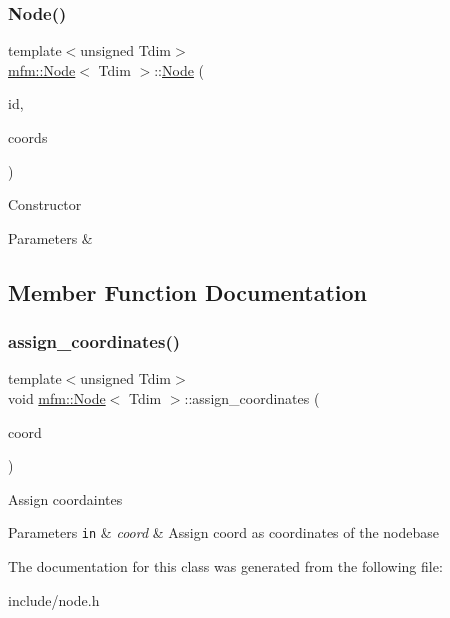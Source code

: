 \subsubsection{\texorpdfstring{Node()}{Node()}}
{\footnotesize\ttfamily template$<$unsigned Tdim$>$ \\
\hyperlink{classmfm_1_1_node}{mfm\+::\+Node}$<$ Tdim $>$\+::\hyperlink{classmfm_1_1_node}{Node} (\begin{DoxyParamCaption}\item[{\hyperlink{namespacemfm_a7d021c8caa1852f673d78358edc6b7f9}{mfm\+::\+Index}}]{id,  }\item[{const \hyperlink{classmfm_1_1_node_a528ae22876ff7f38409424f9db181727}{Vector\+Dim} \&}]{coords }\end{DoxyParamCaption})}

Constructor 
\begin{DoxyParams}{Parameters}
{\em } & \\
\hline
\end{DoxyParams}


\subsection{Member Function Documentation}
\mbox{\label{classmfm_1_1_node_a7744a3637ff17d5443ce965a73a571c2}} 
\subsubsection{\texorpdfstring{assign\+\_\+coordinates()}{assign\_coordinates()}}
{\footnotesize\ttfamily template$<$unsigned Tdim$>$ \\
void \hyperlink{classmfm_1_1_node}{mfm\+::\+Node}$<$ Tdim $>$\+::assign\+\_\+coordinates (\begin{DoxyParamCaption}\item[{const \hyperlink{classmfm_1_1_node_a528ae22876ff7f38409424f9db181727}{Vector\+Dim} \&}]{coord }\end{DoxyParamCaption})\hspace{0.3cm}{\ttfamily [inline]}}

Assign coordaintes 
\begin{DoxyParams}[1]{Parameters}
\mbox{\tt in}  & {\em coord} & Assign coord as coordinates of the nodebase \\
\hline
\end{DoxyParams}


The documentation for this class was generated from the following file\+:\begin{DoxyCompactItemize}
\item 
include/node.\+h\end{DoxyCompactItemize}

